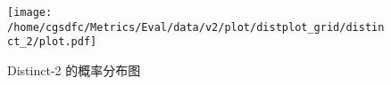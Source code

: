 \begin{figure}[H]%
\centering%
\texttt{[image: /home/cgsdfc/Metrics/Eval/data/v2/plot/distplot\_grid/distinct\_2/plot.pdf]}%
\caption{Distinct{-}2 的概率分布图}%
\label{fig:Distinct{-}2dist}%
\end{figure}